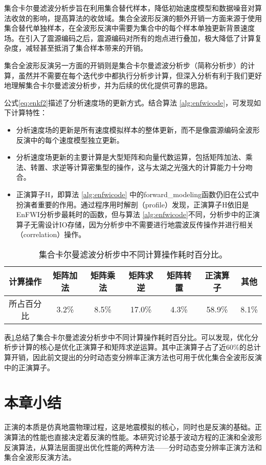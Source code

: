 集合卡尔曼滤波分析步旨在利用集合替代样本，降低初始速度模型和数据噪音对算法收敛的影响，提高算法的收敛域。集合全波形反演的额外开销一方面来源于使用集合替代单独样本，在全波形反演中需要为集合中的每个样本单独更新背景速度场。在引入了震源编码之后，震源编码对所有的炮点进行叠加，极大降低了计算复杂度，减轻甚至抵消了集合样本带来的开销。

集合全波形反演另一方面的开销则是集合卡尔曼滤波分析步（简称分析步）的计算，虽然并不需要在每个迭代步中都执行分析步计算，但深入分析有利于我们更好地理解集合卡尔曼滤波分析步，并为后续的优化提供可靠的思路。

公式\ref{eq:enkf2}描述了分析速度场的更新方式。结合算法 \ref{alg:enfwicode}，可发现如下计算特性：
\begin{itemize}
  \item 分析速度场的更新是所有速度模拟样本的整体更新，而不是像震源编码全波形反演中的每个速度模型独立更新。
  \item 分析速度场更新的主要计算是大型矩阵和向量代数运算，包括矩阵加法、乘法、转置、求逆等计算密集型的操作，这与太湖之光强大的计算能力十分吻合。
  \item 正演算子$\mbox{H}$，即算法 \ref{alg:enfwicode} 中的forward\_modeling函数仍旧在公式中扮演者重要的作用。通过程序用时解剖（profile）发现，正演算子$\mbox{H}$依旧是EnFWI分析步最耗时的函数，但与算法 \ref{alg:enfwicode}不同，分析步中的正演算子无需设计IO存储，因为分析步中不需要进行地震波反传操作并进行相关（correlation）操作。
\end{itemize}

\begin{table}[ht]
\centering
\caption{集合卡尔曼滤波分析步中不同计算操作耗时百分比。}
\label{tb:enkfprofile}
\begin{tabular}{ccccccc}
\hline
计算操作  & 矩阵加法  & 矩阵乘法  & 矩阵求逆   & 矩阵转置  & 正演算子   & 其他    \\\hline
所占百分比 & 3.2\% & 8.5\% & 17.0\% & 4.3\% & 58.9\% & 8.1\% \\\hline
\end{tabular}
\end{table}
表\ref{tb:enkfprofile}总结了集合卡尔曼滤波分析步中不同计算操作耗时百分比。可以发现，优化分析步计算的核心是优化正演算子和矩阵求逆运算。其中正演算子占了近60\%的总计算开销，因此前文提出的分时动态变分辨率正演方法也可用于优化集合全波形反演中的正演算子。



\section{本章小结} %
正演的本质是仿真地震物理过程，这是地震模拟的核心，同时也是反演的基础。正演算法的性能也直接决定着反演的性能。本研究讨论基于波动方程的正演和全波形反演算法，从算法层面提出优化性能的两种方法——分时动态变分辨率正演方法和集合全波形反演方法。

